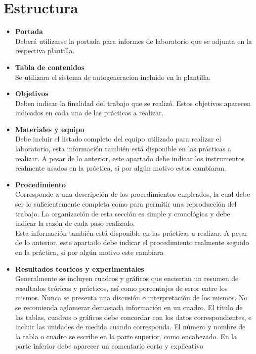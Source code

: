 \documentclass{report}
\begin{document}
\section{Estructura}
\begin{itemize}
\item \textbf{Portada}\\
Deberá utilizarse la portada para informes de laboratorio que se adjunta en la respectiva plantilla.
\item \textbf{Tabla de contenidos}\\
Se utilizara el sistema de autogeneracion incluido en la plantilla.
\item \textbf{Objetivos}\\
Deben indicar la finalidad del trabajo que se realizó. Estos objetivos aparecen
indicados en cada una de las prácticas a realizar.
\item \textbf{Materiales y equipo}\\
Debe incluir el listado completo del equipo utilizado para realizar el laboratorio,
esta información también está disponible en las prácticas a realizar. A pesar de lo
anterior, este apartado debe indicar los instrumentos realmente usados en la
práctica, si por algún motivo estos cambiaran.
\item \textbf{Procedimiento}\\
Corresponde a una descripción de los procedimientos empleados, la cual debe ser
lo suficientemente completa como para permitir una reproducción del trabajo. La
organización de esta sección es simple y cronológica y debe indicar la razón de
cada paso realizado.\\
Esta información también está disponible en las prácticas a realizar. A pesar de lo
anterior, este apartado debe indicar el procedimiento realmente seguido en la
práctica, si por algún motivo este cambiara
\item \textbf{Resultados teoricos y experimentales}\\
Generalmente se incluyen cuadros y gráficos que encierran un resumen de
resultados teóricos y prácticos, así como porcentajes de error entre los mismos.
Nunca se presenta una discusión o interpretación de los mismos.
No se recomienda aglomerar demasiada información en un cuadro. El título de las
tablas, cuadros o gráficos debe concordar con los datos correspondientes, e incluir
las unidades de medida cuando corresponda.
El número y nombre de la tabla o cuadro se escribe en la parte superior, como
encabezado. En la parte inferior debe aparecer un comentario corto y explicativo

\end{itemize}
\end{document}
